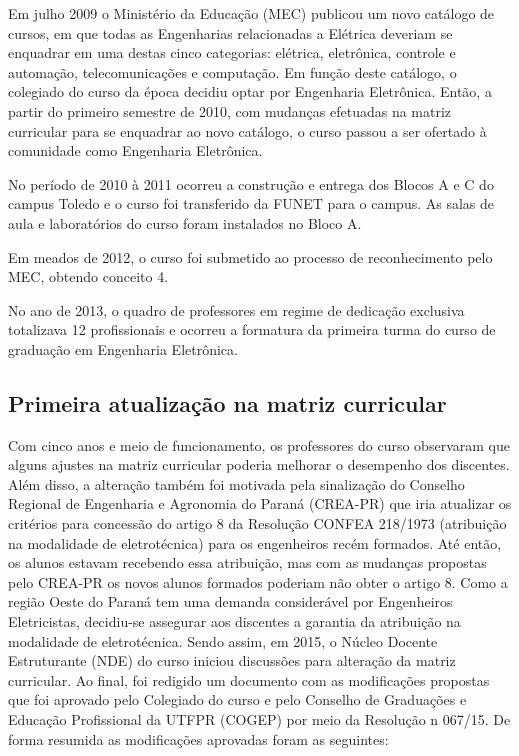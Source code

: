 
Em julho 2009 o Ministério da Educação (MEC) publicou um novo catálogo de cursos, em que todas as Engenharias relacionadas a Elétrica deveriam se enquadrar em uma destas cinco categorias: elétrica, eletrônica, controle e automação, telecomunicações e computação. Em função deste catálogo, o colegiado do curso da época decidiu optar por Engenharia Eletrônica. Então, a partir do primeiro semestre de 2010, com mudanças efetuadas na matriz curricular para se enquadrar ao novo catálogo, o curso passou a ser ofertado à comunidade como Engenharia Eletrônica.


No período de 2010 à 2011 ocorreu a construção e entrega dos Blocos A e C do campus Toledo e o curso foi transferido da FUNET para o campus. As salas de aula e laboratórios do curso foram instalados no Bloco A.

Em meados de 2012, o curso foi submetido ao processo de reconhecimento pelo MEC, obtendo conceito 4.

No ano de 2013, o quadro de professores em regime de dedicação exclusiva totalizava 12 profissionais e ocorreu a formatura da primeira turma do curso de graduação em Engenharia Eletrônica.

\subsection{Primeira atualização na matriz curricular}

Com cinco anos e meio de funcionamento, os professores do curso observaram que alguns ajustes na matriz curricular poderia melhorar  o desempenho dos discentes. Além disso, a alteração também foi motivada pela sinalização do Conselho Regional de Engenharia e Agronomia do Paraná (CREA-PR) que iria atualizar os critérios para concessão do artigo 8\textordmasculine{} da Resolução CONFEA 218/1973 (atribuição na modalidade de eletrotécnica) para os engenheiros recém formados. Até então, os alunos estavam recebendo essa atribuição, mas com as mudanças propostas pelo CREA-PR os novos alunos formados poderiam não obter o artigo 8\textordmasculine{}. Como a região Oeste do Paraná tem uma demanda considerável por Engenheiros Eletricistas, decidiu-se assegurar aos discentes a garantia da atribuição na modalidade de eletrotécnica. Sendo assim, em 2015, o Núcleo Docente Estruturante (NDE) do curso iniciou discussões para alteração da matriz curricular. Ao final, foi redigido um documento com as modificações propostas que foi aprovado pelo Colegiado do curso e pelo Conselho de Graduações e Educação Profissional da UTFPR (COGEP) por meio da Resolução n\textordmasculine{} 067/15. De forma resumida as modificações aprovadas foram as seguintes:

